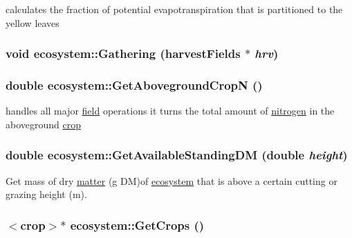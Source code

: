 calculates the fraction of potential evapotranspiration that is partitioned to the yellow leaves \hypertarget{classecosystem_aabf317448ce162f6c103aea18ca05970}{
\subsubsection[{Gathering}]{\setlength{\rightskip}{0pt plus 5cm}void ecosystem::Gathering ({\bf harvestFields} $\ast$ {\em hrv})}}
\label{classecosystem_aabf317448ce162f6c103aea18ca05970}
\hypertarget{classecosystem_a6b64028f9210f9b93d8edd22daae15d4}{
\subsubsection[{GetAbovegroundCropN}]{\setlength{\rightskip}{0pt plus 5cm}double ecosystem::GetAbovegroundCropN ()}}
\label{classecosystem_a6b64028f9210f9b93d8edd22daae15d4}


handles all major \hyperlink{classfield}{field} operations it turns the total amount of \hyperlink{classnitrogen}{nitrogen} in the aboveground \hyperlink{classcrop}{crop} \hypertarget{classecosystem_a7ba741f8baf9bc7a8fc5f95cb308c7d2}{
\subsubsection[{GetAvailableStandingDM}]{\setlength{\rightskip}{0pt plus 5cm}double ecosystem::GetAvailableStandingDM (double {\em height})}}
\label{classecosystem_a7ba741f8baf9bc7a8fc5f95cb308c7d2}


Get mass of dry \hyperlink{classmatter}{matter} (g DM)of \hyperlink{classecosystem}{ecosystem} that is above a certain cutting or grazing height (m). \hypertarget{classecosystem_a76aa55a306d04f87b0acff0c405d3352}{
\subsubsection[{GetCrops}]{$<${\bf crop}$>$$\ast$ ecosystem::GetCrops ()}}
\label{classecosystem_a76aa55a306d04f87b0acff0c405d3352}


